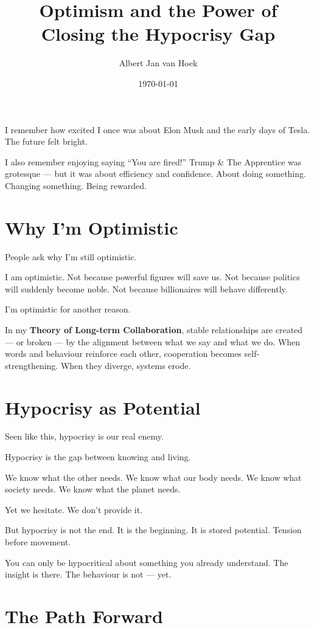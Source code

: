 \documentclass{article}
\title{Optimism and the Power of Closing the Hypocrisy Gap}
\author{Albert Jan van Hoek}
\date{\today}
\begin{document}
\maketitle

I remember how excited I once was about Elon Musk and the early days of Tesla. The future felt bright.

I also remember enjoying saying ``You are fired!'' Trump \& The Apprentice was grotesque — but it was about efficiency and confidence. About doing something. Changing something. Being rewarded.

\section*{Why I’m Optimistic}

People ask why I’m still optimistic.

I am optimistic. Not because powerful figures will save us. Not because politics will suddenly become noble. Not because billionaires will behave differently.

I’m optimistic for another reason.

In my \textbf{Theory of Long-term Collaboration}, stable relationships are created — or broken — by the alignment between what we say and what we do. When words and behaviour reinforce each other, cooperation becomes self-strengthening. When they diverge, systems erode.

\section*{Hypocrisy as Potential}

Seen like this, hypocrisy is our real enemy.

Hypocrisy is the gap between knowing and living.

We know what the other needs.
We know what our body needs.
We know what society needs.
We know what the planet needs.

Yet we hesitate. We don’t provide it.

But hypocrisy is not the end. It is the beginning.
It is stored potential.
Tension before movement.

You can only be hypocritical about something you already understand. The insight is there. The behaviour is not — yet.

\section*{The Path Forward}
\end{document}
